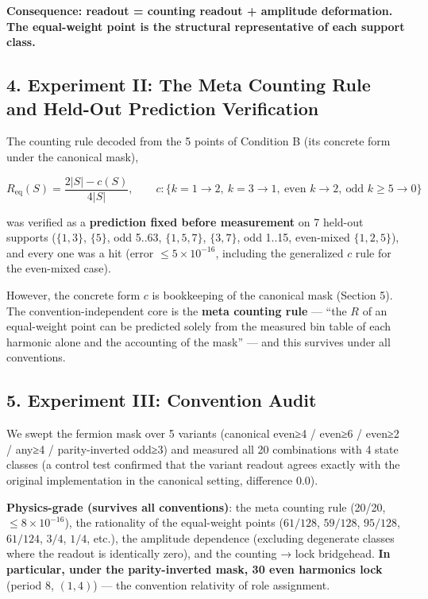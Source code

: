 \documentclass[
  a4paper,
]{article}
\begin{document}
\textbf{Consequence: readout = counting readout + amplitude deformation.
The equal-weight point is the structural representative of each support
class.}

\subsection{4. Experiment II: The Meta Counting Rule and Held-Out
Prediction
Verification}\label{experiment-ii-the-meta-counting-rule-and-held-out-prediction-verification}

The counting rule decoded from the 5 points of Condition B (its concrete
form under the canonical mask),

\[
R_{\mathrm{eq}}(S)=\frac{2|S|-c(S)}{4|S|},\qquad
c:\{k{=}1\to2,\ k{=}3\to1,\ \text{even }k\to2,\ \text{odd }k{\ge}5\to0\}
\]

was verified as a \textbf{prediction fixed before measurement} on 7
held-out supports (\(\{1,3\}\), \(\{5\}\), odd 5..63, \(\{1,5,7\}\),
\(\{3,7\}\), odd 1..15, even-mixed \(\{1,2,5\}\)), and every one was a
hit (error \(\le5\times10^{-16}\), including the generalized \(c\) rule
for the even-mixed case).

However, the concrete form \(c\) is bookkeeping of the canonical mask
(Section 5). The convention-independent core is the \textbf{meta
counting rule} --- ``the \(R\) of an equal-weight point can be predicted
solely from the measured bin table of each harmonic alone and the
accounting of the mask'' --- and this survives under all conventions.

\subsection{5. Experiment III: Convention
Audit}\label{experiment-iii-convention-audit}

We swept the fermion mask over 5 variants (canonical even≥4 / even≥6 /
even≥2 / any≥4 / parity-inverted odd≥3) and measured all 20 combinations
with 4 state classes (a control test confirmed that the variant readout
agrees exactly with the original implementation in the canonical
setting, difference \(0.0\)).

\textbf{Physics-grade (survives all conventions)}: the meta counting
rule (20/20, \(\le8\times10^{-16}\)), the rationality of the
equal-weight points (\(61/128\), \(59/128\), \(95/128\), \(61/124\),
\(3/4\), \(1/4\), etc.), the amplitude dependence (excluding degenerate
classes where the readout is identically zero), and the counting → lock
bridgehead. \textbf{In particular, under the parity-inverted mask, 30
even harmonics lock} (period 8, \((1,4)\)) --- the convention relativity
of role assignment.
\end{document}
